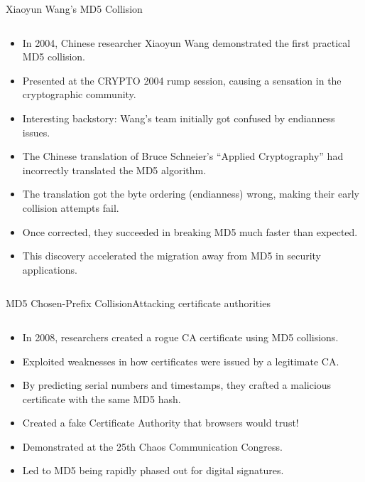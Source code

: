 \documentclass[aspectratio=169, lualatex, handout]{beamer}
\begin{document}
\begin{frame}{Xiaoyun Wang's MD5 Collision}
	\begin{columns}[c]
		\begin{column}{1\textwidth}
			\begin{itemize}[<+->]
				\item In 2004, Chinese researcher Xiaoyun Wang demonstrated the first practical MD5 collision.
				\item Presented at the CRYPTO 2004 rump session, causing a sensation in the cryptographic community.
				\item Interesting backstory: Wang's team initially got confused by endianness issues.
				\item The Chinese translation of Bruce Schneier's ``Applied Cryptography'' had incorrectly translated the MD5 algorithm.
				\item The translation got the byte ordering (endianness) wrong, making their early collision attempts fail.
				\item Once corrected, they succeeded in breaking MD5 much faster than expected.
				\item This discovery accelerated the migration away from MD5 in security applications.
			\end{itemize}
		\end{column}
	\end{columns}
\end{frame}

\begin{frame}{MD5 Chosen-Prefix Collision}{Attacking certificate authorities}
	\begin{columns}[c]
		\begin{column}{1\textwidth}
			\begin{itemize}[<+->]
				\item In 2008, researchers created a rogue CA certificate using MD5 collisions.
				\item Exploited weaknesses in how certificates were issued by a legitimate CA.
				\item By predicting serial numbers and timestamps, they crafted a malicious certificate with the same MD5 hash.
				\item Created a fake Certificate Authority that browsers would trust!
				\item Demonstrated at the 25th Chaos Communication Congress.
				\item Led to MD5 being rapidly phased out for digital signatures.
			\end{itemize}
		\end{column}
	\end{columns}
\end{frame}
\end{document}
